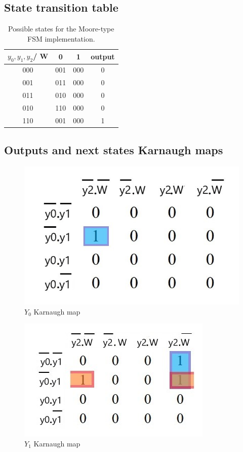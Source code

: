 \documentclass[../../e3_tp3_main.tex]{subfiles}
\begin{document}
\subsection{State transition table}

\begin{table}[H]	%
	\centering
	\begin{tabular}{|c|c|c|c|}
	\hline 
	$y_0,y_1,y_2$/ W & 0 & 1 & output\\ 
	\hline 
	000 & 001 & 000 & 0\\ 
	\hline 
	001 & 011 & 000 & 0\\ 
	\hline 
	011 & 010 & 000 & 0\\ 
	\hline 
	010 & 110 & 000 & 0\\ 
	\hline 
	110 & 001 & 000 & 1\\ 
	\hline 
	\end{tabular} 
	\caption{Possible states for the Moore-type FSM implementation.}
	\label{tab:ej3_moore_states}
\end{table}


\subsection{Outputs and next states Karnaugh maps}
\begin{figure}[H]
	\centering
	\includegraphics[scale=0.65]{figures/e3_tp3_ej2_moore_y0_kmap.jpg}
	\caption{$Y_0$ Karnaugh map}
\end{figure}

\begin{figure}[H]
	\centering
	\includegraphics[scale=1]{figures/e3_tp3_ej2_moore_y1_kmap.jpg}
	\caption{$Y_1$ Karnaugh map}
\end{figure}
\end{document}
